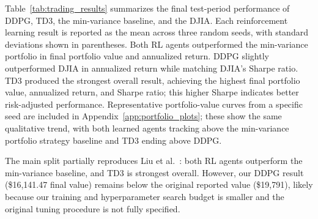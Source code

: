 \documentclass{article}
\begin{document}
Table~\ref{tab:trading_results} summarizes the final test-period performance of DDPG, TD3, the min-variance baseline, and the DJIA. Each reinforcement learning result is reported as the mean across three random seeds, with standard deviations shown in parentheses. Both RL agents outperformed the min-variance portfolio in final portfolio value and annualized return. DDPG slightly outperformed DJIA in annualized return while matching DJIA's Sharpe ratio. TD3 produced the strongest overall result, achieving the highest final portfolio value, annualized return, and Sharpe ratio; this higher Sharpe indicates better risk-adjusted performance. Representative portfolio-value curves from a specific seed are included in Appendix~\ref{app:portfolio_plots}; these show the same qualitative trend, with both learned agents tracking above the min-variance portfolio strategy baseline and TD3 ending above DDPG.


\begin{table}[H]
\centering
\caption{Trading performance on the 2016--2018 test period. RL results are reported as mean across seeds, with standard deviation in parentheses.}
\label{tab:trading_results}
\end{table}

The main split partially reproduces Liu et al.\ \cite{liu2018practical}: both RL agents outperform the min-variance baseline, and TD3 is strongest overall. However, our DDPG result (\$16{,}141.47 final value) remains below the original reported value (\$19{,}791), likely because our training and hyperparameter search budget is smaller and the original tuning procedure is not fully specified.
\end{document}
